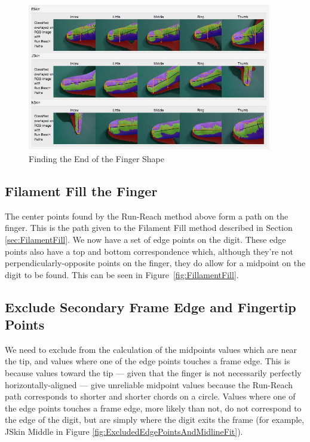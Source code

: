 \begin{figure}[h!]
  \centering
    \includegraphics[width=0.95\textwidth]{Chapter4/Figs/FindingTheTip.jpg}
    \caption{Finding the End of the Finger Shape}\label{fig:FindingTheTip}
\end{figure}



\subsection{Filament Fill the Finger}\label{sec:FilamentFillTheFinger}
The center points found by the Run-Reach method above form a path on the finger. This is the path given to the Filament Fill method described in Section \ref{sec:FilamentFill}. We now have a set of edge points on the digit. These edge points also have a top and bottom correspondence which, although they're not perpendicularly-opposite points on the finger, they do allow for a midpoint on the digit to be found. This can be seen in Figure~\ref{fig:FillamentFill}.

\subsection{Exclude Secondary Frame Edge and Fingertip Points }\label{sec:ExcludeSecondaryFrameEdgePointsAndFingertipPoints}
We need to exclude from the calculation of the midpoints values which are near the tip, and values where one of the edge points touches a frame edge. This is because values toward the tip --- given that the finger is not necessarily perfectly horizontally-aligned --- give unreliable midpoint values because the Run-Reach path corresponds to shorter and shorter chords on a circle. Values where one of the edge points touches a frame edge, more likely than not, do not correspond to the edge of the digit, but are simply where the digit exits the frame (for example, JSkin Middle in Figure \ref{fig:ExcludedEdgePointsAndMidlineFit}).

